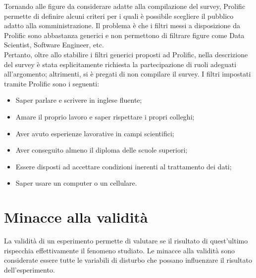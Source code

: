 Tornando alle figure da considerare adatte alla compilazione del survey, Prolific permette di definire alcuni criteri per i quali è possibile scegliere il pubblico adatto alla somministrazione. Il problema è che i filtri messi a disposizione da Prolific sono abbastanza generici e non permettono di filtrare figure come Data Scientist, Software Engineer, etc.\\
Pertanto, oltre allo stabilire i filtri generici proposti ad Prolific, nella descrizione del survey è stata esplicitamente richiesta la partecipazione di ruoli adeguati all'argomento; altrimenti, si è pregati di non compilare il survey. I filtri impostati tramite Prolific sono i seguenti:
\begin{itemize}
    \item Saper parlare e scrivere in inglese fluente;
    \item Amare il proprio lavoro e saper rispettare i propri colleghi;
    \item Aver avuto esperienze lavorative in campi scientifici;
    \item Aver conseguito almeno il diploma delle scuole superiori;
    \item Essere disposti ad accettare condizioni inerenti al trattamento dei dati;
    \item Saper usare un computer o un cellulare.
\end{itemize}

\section{Minacce alla validità}
La validità di un esperimento permette di valutare se il risultato di quest'ultimo rispecchia effettivamente il fenomeno studiato. Le minacce alla validità sono considerate essere tutte le variabili di disturbo che possano influenzare il risultato dell'esperimento.\\
